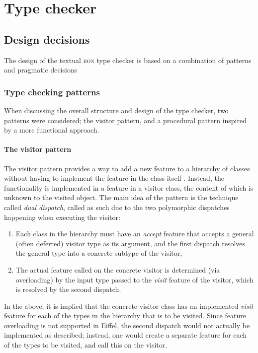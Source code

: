 \section{Type checker}
\subsection{Design decisions}
The design of the textual \textsc{bon} type checker is based on a combination of patterns and pragmatic decisions
\subsubsection{Type checking patterns}
When discussing the overall structure and design of the type checker, two patterns were considered; the visitor pattern, and a procedural pattern inspired by a more functional approach.

\paragraph{The visitor pattern} %
The visitor pattern provides a way to add a new feature to a hierarchy of classes without having to implement the feature in the class itself \cite{martin2002}. Instead, the functionality is implemented in a feature in a visitor class, the content of which is unknown to the visited object. The main idea of the pattern is the technique called \textit{dual dispatch}, called as such due to the two polymorphic dispatches happening when executing the visitor: 
\begin{enumerate}
\item Each class in the hierarchy must have an \textit{accept} feature that accepts a general (often deferred) visitor type as its argument, and the first dispatch resolves the general type into a concrete subtype of the visitor,
\item The actual feature called on the concrete visitor is determined (via overloading) by the input type passed to the \textit{visit} feature of the visitor, which is resolved by the second dispatch.  
\end{enumerate}
In the above, it is implied that the concrete visitor class has an implemented \textit{visit} feature for each of the types in the hierarchy that is to be visited. Since feature overloading is not supported in Eiffel, the second dispatch would not actually be implemented as described; instead, one would create a separate feature for each of the types to be visited, and call this on the visitor.
